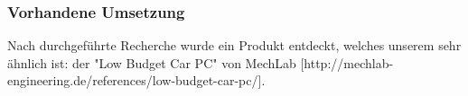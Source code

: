 \subsubsection{Vorhandene Umsetzung}
\label{subsec:Vorhandene Umsetzung}
Nach durchgeführte Recherche wurde ein Produkt entdeckt, welches unserem sehr ähnlich ist: der "Low Budget Car PC" von MechLab [http://mechlab-engineering.de/references/low-budget-car-pc/].
